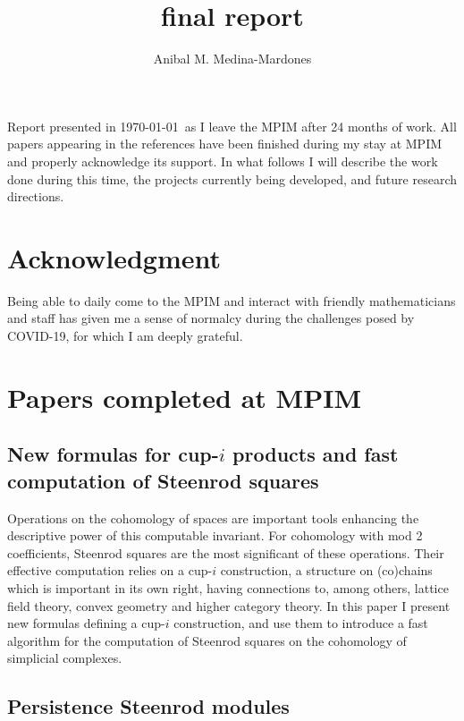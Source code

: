 \documentclass{amsart}
\theoremstyle{definition}
\begin{document}
	\title{final report}
	\author{Anibal M. Medina-Mardones}

	\vspace*{-1cm}

	\maketitle

	Report presented in \today\ as I leave the MPIM after 24 months of work.
	All papers appearing in the references have been finished during my stay at MPIM and properly acknowledge its support.
	In what follows I will describe the work done during this time, the projects currently being developed, and future research directions.

	\tableofcontents

	\section*{Acknowledgment}

	Being able to daily come to the MPIM and interact with friendly mathematicians and staff has given me a sense of normalcy during the challenges posed by COVID-19, for which I am deeply grateful.

	\section{Papers completed at MPIM}

	\subsection{New formulas for cup-$i$ products and fast computation of Steenrod squares \cite{medina2023fast_sq}}

	Operations on the cohomology of spaces are important tools enhancing the descriptive power of this computable invariant.
	For cohomology with mod 2 coefficients, Steenrod squares are the most significant of these operations. Their effective computation relies on a cup-$i$ construction, a structure on (co)chains which is important in its own right, having connections to, among others, lattice field theory, convex geometry and higher category theory.
	In this paper I present new formulas defining a cup-$i$ construction, and use them to introduce a fast algorithm for the computation of Steenrod squares on the cohomology of simplicial complexes.

	\subsection{Persistence Steenrod modules \cite{medina2022per_st}}
\end{document}
